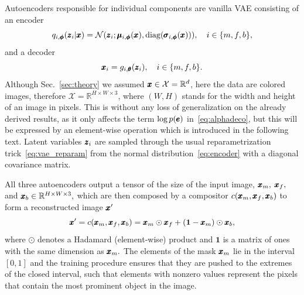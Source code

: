 Autoencoders responsible for individual components are vanilla VAE consisting of an encoder
\begin{equation} \label{eq:encoder}
    q_{i,\vc{\phi}}(\vc{z}_i \vert \vc{x}) = \mathcal{N} \left(\vc{z}_i; \vc{\mu}_{i,\vc{\phi}}(\vc{x}), \text{diag}(\vc{\sigma}_{i,\vc{\phi}}(\vc{x})) \right), \quad i \in \lbrace m, f, b \rbrace,
\end{equation}
 and a decoder 
\begin{equation} \label{eq:decoder}
    \pmb{{x}}_i = g_{i,\pmb{{\theta}}} (\pmb{{z}}_i),\quad i \in \lbrace m, f, b \rbrace.
\end{equation}
Although Sec.~\ref{sec:theory} we assumed $\pmb{{x}} \in \mathcal{X} = \mathbb{R}^d$, here the data are colored images, therefore $\mathcal{X} = \mathbb{R}^{H \times W \times 3}$, where $(W,H)$ stands for the width and height of an image in pixels. This is without any loss of generalization on the already derived results, as it only affects the term $\log p(\pmb{{e}})$ in~\eqref{eq:alphadeco}, but this will be expressed by an element-wise operation which is introduced in the following text. Latent variables $\pmb{{z}}_i$ are sampled through the usual reparametrization trick~\eqref{eq:vae_reparam} from the normal distribution~\eqref{eq:encoder} with a diagonal covariance matrix.

All three autoencoders output a tensor of the size of the input image, $\pmb{{x}}_m,$ $\pmb{{x}}_f,$ and $\pmb{{x}}_b \in \mathbb{R}^{H \times W \times 3},$ which are then composed by a compositor $c(\pmb{{x}}_m,\pmb{{x}}_f,\pmb{{x}}_b)$ to form a reconstructed image $\pmb{{x}}'$
\begin{equation}
    \pmb{{x}}' = c(\pmb{{x}}_m,\pmb{{x}}_f,\pmb{{x}}_b) = \pmb{{x}}_m \odot \pmb{{x}}_f + (\mathbf{1} - \pmb{{x}}_m) \odot \pmb{{x}}_b, \label{eq:composition}
\end{equation}
where $\odot$ denotes a Hadamard (element-wise) product and $\mathbf{1}$ is a matrix of ones with the same dimension as $\pmb{{x}}_m.$ The elements of the mask $\pmb{{x}}_m$ lie in the interval $[0,1]$ and the training procedure ensures that they are pushed to the extremes of the closed interval, such that elements with nonzero values represent the pixels that contain the most prominent object in the image. 

